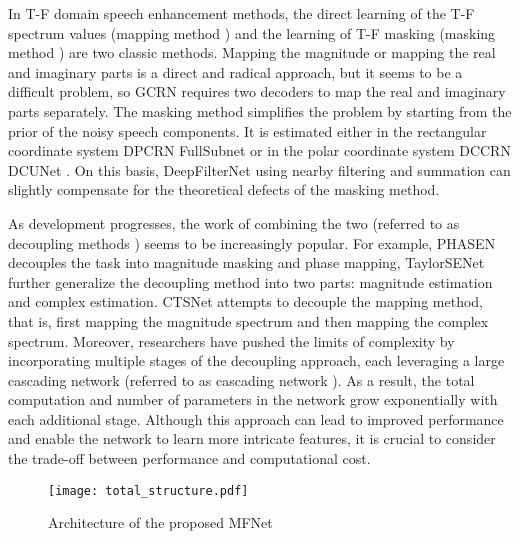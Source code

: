 \documentclass{INTERSPEECH2023}
\begin{document}
In T-F domain speech enhancement methods, the direct learning of the T-F spectrum values (mapping method \cite{xu2014regression,tan2019GCRN}) and the learning of T-F masking (masking method \cite{hu2020dccrn,wang2014training}) are two classic methods. 
  Mapping the magnitude \cite{xu2014regression} or mapping the real and imaginary parts is a direct and radical approach, but it seems to be a difficult problem, so GCRN \cite{tan2019GCRN} requires two decoders to map the real and imaginary parts separately. The masking method simplifies the problem by starting from the prior of the noisy speech components. It is estimated either in the rectangular coordinate system DPCRN \cite{le2021dpcrn} FullSubnet \cite{hao2021fullsubnet} or in the polar coordinate system DCCRN \cite{hu2020dccrn} DCUNet \cite{DCUNET}. On this basis, DeepFilterNet \cite{schroter2022deepfilternet,schroter2022deepfilternet2} using nearby filtering and summation can slightly compensate for the theoretical defects of the masking method. 

As development progresses, the work of combining the two (referred to as  decoupling methods \cite{yin2020phasen,li2022taylor,ctsnet,HGCN+}) seems to be increasingly popular. For example, PHASEN \cite{yin2020phasen} decouples the task into magnitude masking and phase mapping, TaylorSENet \cite{li2022taylor} further generalize the decoupling method into two parts: magnitude estimation and complex estimation. CTSNet \cite{ctsnet} attempts to decouple the mapping method, that is, first mapping the magnitude spectrum and then mapping the complex spectrum. Moreover, researchers have pushed the limits of complexity by incorporating multiple stages of the decoupling approach, each leveraging a large cascading network (referred to as cascading network \cite{li2021iDMP,li2021sdd,zhao2022frcrn,wang2021tripledomain}). As a result, the total computation and number of parameters in the network grow exponentially with each additional stage. Although this approach can lead to improved performance and enable the network to learn more intricate features, it is crucial to consider the trade-off between performance and computational cost.






\begin{figure*}[!ht] \centering \texttt{[image: total\_structure.pdf]} \caption{Architecture of the proposed MFNet} \label{Fig1} \end{figure*}
\end{document}
